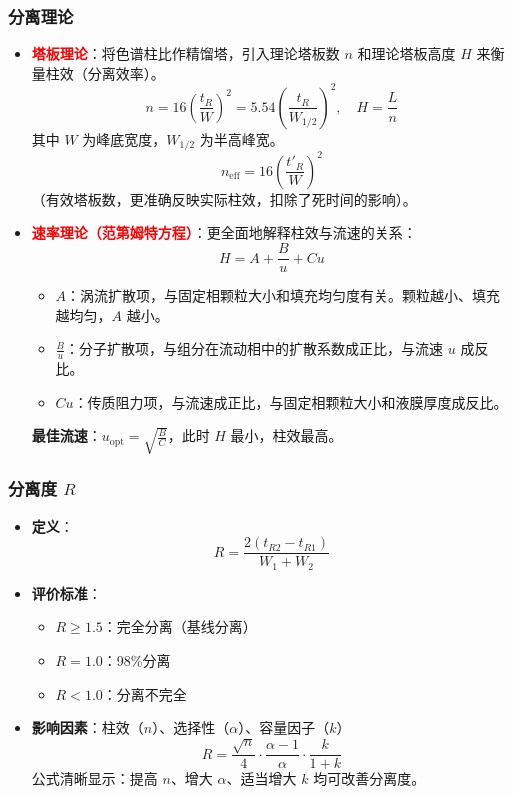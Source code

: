 \documentclass[11pt,a4paper]{article}
\newcommand{\core}[1]{\textcolor{red}{\textbf{#1}}}
\begin{document}
\subsubsection{分离理论}
\begin{itemize}
    \item \core{塔板理论}：将色谱柱比作精馏塔，引入理论塔板数 \( n \) 和理论塔板高度 \( H \) 来衡量柱效（分离效率）。
    \[
    \boxed{n = 16 \left( \frac{t_R}{W} \right)^2 = 5.54 \left( \frac{t_R}{W_{1/2}} \right)^2, \quad H = \frac{L}{n}}
    \]
    其中 \( W \) 为峰底宽度，\( W_{1/2} \) 为半高峰宽。
    \[
    n_{\text{eff}} = 16 \left( \frac{t'_R}{W} \right)^2
    \]
    （有效塔板数，更准确反映实际柱效，扣除了死时间的影响）。
    \item \core{速率理论（范第姆特方程）}：更全面地解释柱效与流速的关系：
    \[
    \boxed{H = A + \frac{B}{u} + C u}
    \]
    \begin{itemize}
        \item \( A \)：涡流扩散项，与固定相颗粒大小和填充均匀度有关。颗粒越小、填充越均匀，\( A \) 越小。
        \item \( \frac{B}{u} \)：分子扩散项，与组分在流动相中的扩散系数成正比，与流速 \( u \) 成反比。
        \item \( C u \)：传质阻力项，与流速成正比，与固定相颗粒大小和液膜厚度成反比。
    \end{itemize}
    \textbf{最佳流速}：\( u_{\text{opt}} = \sqrt{\frac{B}{C}} \)，此时 \( H \) 最小，柱效最高。
\end{itemize}

\subsubsection{\texorpdfstring{分离度 \( R \)}{分离度 R}}
\begin{itemize}
    \item \textbf{定义}：
    \[
    R = \frac{2(t_{R2} - t_{R1})}{W_1 + W_2}
    \]
    \item \textbf{评价标准}：
    \begin{itemize}
        \item \( R \geq 1.5 \)：完全分离（基线分离）
        \item \( R = 1.0 \)：98\%分离
        \item \( R < 1.0 \)：分离不完全
    \end{itemize}
    \item \textbf{影响因素}：柱效（\( n \)）、选择性（\( \alpha \)）、容量因子（\( k \)）
    \[
    \boxed{R = \frac{\sqrt{n}}{4} \cdot \frac{\alpha - 1}{\alpha} \cdot \frac{k}{1 + k}}
    \]
    公式清晰显示：提高 \( n \)、增大 \( \alpha \)、适当增大 \( k \) 均可改善分离度。
\end{itemize}
\end{document}
